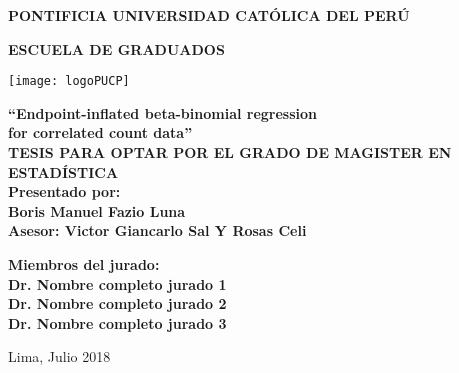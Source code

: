 \documentclass[11pt,oneside,a4paper]{book}
\begin{document}
\frontmatter \onehalfspacing  %

\thispagestyle{empty}
\begin{center}
\vspace*{1cm}
\textbf{\Large{PONTIFICIA UNIVERSIDAD CAT\'OLICA DEL PER\'U }}\\
\vspace*{1.2cm}

\textbf{\Large{ESCUELA DE GRADUADOS}}\\
\vspace*{0.5cm}
\begin{center}
\texttt{[image: logoPUCP]}
\end{center}
\vspace{0.5cm}

\textbf{\Large{``Endpoint-inflated beta-binomial regression\\for correlated count data''}}\\
\vspace{1.2cm}
\textbf{\large{TESIS PARA OPTAR POR EL GRADO DE MAGISTER EN\\
  ESTAD\'ISTICA}}\\
  
\vspace*{1.2cm}
\textbf{\large{Presentado por:}}\\
\vspace*{0.3cm}
\textbf{\large{Boris Manuel Fazio Luna}}\\
\vspace*{1.2cm}
\textbf{\large{Asesor: Victor Giancarlo Sal Y Rosas Celi}}\\

\vspace*{1.2cm}

\textbf{\large{
	Miembros del jurado:\\
	Dr. Nombre completo jurado 1 \\
	Dr. Nombre completo jurado 2 \\
	Dr. Nombre completo jurado 3  
	}} 
	   
\vspace*{1.2cm}
    
\normalsize{Lima, Julio 2018}
\end{center}

\end{document}

